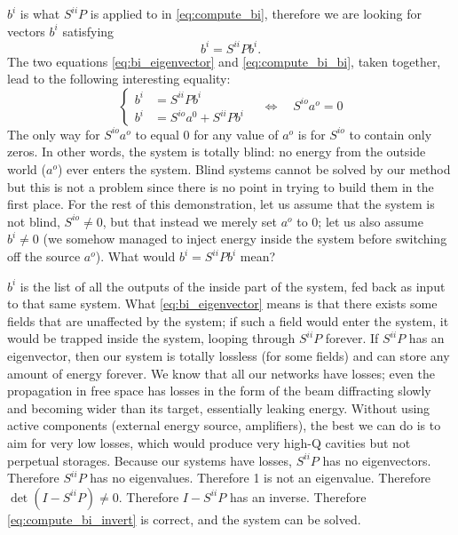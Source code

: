 $b^i$ is what $S^{ii}P$ is applied to in \cref{eq:compute_bi}, therefore we are looking for vectors $b^i$ satisfying
\begin{equation}
    b^i = S^{ii}P b^i \text{.} \label{eq:bi_eigenvector}
\end{equation}
The two equations \cref{eq:bi_eigenvector} and  \cref{eq:compute_bi_bi}, taken together, 
lead to the following interesting equality:
\begin{equation}
    \left\lbrace
        \begin{aligned}
            b^i &= S^{ii}P b^i \\
            b^i &= S^{io}a^0 + S^{ii}P b^i
        \end{aligned}
    \right.
    \quad
    \Longleftrightarrow
    \quad
    S^{io}a^o = 0
\end{equation}
The only way for $S^{io}a^o$ to equal 0 for any value of $a^o$ is for $S^{io}$ to contain only zeros.
In other words, the system is totally blind: no energy from the outside world ($a^o$) ever enters the system.
Blind systems cannot be solved by our method but this is not a problem since there is no point in trying to build them in the first place.
For the rest of this demonstration, let us assume that the system is not blind, $S^{io}\neq 0$, but that instead we merely set $a^o$ to 0; let us also assume $b^i \neq 0$ (we somehow managed to inject energy inside the system before switching off the source $a^o$).
What would $b^i = S^{ii}P b^i$ mean?

$b^i$ is the list of all the outputs of the inside part of the system, fed back as input to that same system.
What \cref{eq:bi_eigenvector} means is that there exists some fields that are unaffected by the system; if such a field would enter the system, it would be trapped inside the system, looping through $S^{ii}P$ forever.
If $S^{ii}P$ has an eigenvector, then our system is totally lossless (for some fields) and can store any amount of energy forever.
We know that all our networks have losses; even the propagation in free space has losses in the form of the beam diffracting slowly and becoming wider than its target, essentially leaking energy.
Without using active components (external energy source, amplifiers), the best we can do is to aim for very low losses, which would produce very high-Q cavities but not perpetual storages.
Because our systems have losses, $S^{ii}P$ has no eigenvectors.
Therefore $S^{ii}P$ has no eigenvalues.
Therefore 1 is not an eigenvalue.
Therefore $\det(I-S^{ii}P) \neq 0$.
Therefore $I-S^{ii}P$ has an inverse.
Therefore \cref{eq:compute_bi_invert} is correct, and the system can be solved.

